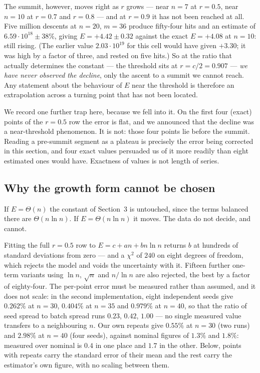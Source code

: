 \documentclass[11pt,a4paper]{article}
\begin{document}
The summit, however, moves right as $r$ grows --- near $n=7$ at $r=0.5$, near $n=10$ at $r=0.7$
and $r=0.8$ --- and at $r=0.9$ it has not been reached at all.  Five million descents at
$n=20$, $m=36$ produce fifty-four hits and an estimate of $6.59\cdot10^{18}\pm38\%$, giving
$E=+4.42\pm0.32$ against the exact $E=+4.08$ at $n=10$: still rising.  (The earlier value
$2.03\cdot10^{19}$ for this cell would have given $+3.30$; it was high by a factor of three, and
rested on five hits.)  So at the ratio that actually determines the constant --- the threshold
sits at $r=c/2=0.907$ --- \emph{we have never observed the decline}, only the ascent to a summit
we cannot reach.  Any statement about the behaviour of $E$ near the threshold is therefore an
extrapolation across a turning point that has not been located.

We record one further trap here, because we fell into it.  On the first four (exact) points of
the $r=0.5$ row the error is flat, and we announced that the decline was a near-threshold
phenomenon.  It is not: those four points lie before the summit.  Reading a pre-summit segment
as a plateau is precisely the error being corrected in this section, and four exact values
persuaded us of it more readily than eight estimated ones would have.  Exactness of values is
not length of series.

\subsection*{Why the growth form cannot be chosen}
If $E=\Theta(n)$ the constant of Section~3 is untouched, since the terms balanced there are
$\Theta(n\ln n)$.  If $E=\Theta(n\ln n)$ it moves.  The data do not decide, and cannot.

Fitting the full $r=0.5$ row to $E=c+an+bn\ln n$ returns $b$ at hundreds of standard deviations
from zero --- and a $\chi^2$ of $240$ on eight degrees of freedom, which rejects the model and
voids the uncertainty with it.  Fifteen further one-term variants using $\ln n$, $\sqrt n$ and
$n/\ln n$ are also rejected, the best by a factor of eighty-four.  The per-point error must be measured rather than assumed, and it does not scale: in the second
implementation, eight independent seeds give $0.262\%$ at $n=30$, $0.404\%$ at $n=35$ and
$0.979\%$ at $n=40$, so that the ratio of seed spread to batch spread runs $0.23$, $0.42$, $1.00$
--- no single measured value transfers to a neighbouring $n$.  Our own repeats give $0.55\%$ at
$n=30$ (two runs) and $2.98\%$ at $n=40$ (four seeds), against nominal figures of $1.3\%$ and
$1.8\%$: measured over nominal is $0.4$ in one place and $1.7$ in the other.  Below, points with
repeats carry the standard error of their mean and the rest carry the estimator's own figure,
with no scaling between them.
\end{document}
